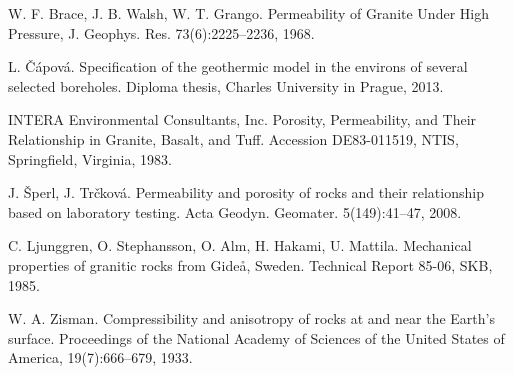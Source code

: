 \documentclass{article}
\begin{document}
\begin{thebibliography}{9}

 W. F. Brace,  J. B. Walsh, W. T. Grango.  Permeability of Granite Under High Pressure, J. Geophys. Res. 73(6):2225--2236, 1968.

 L. Čápová. Specification of the geothermic model in the environs of several selected boreholes. Diploma thesis, Charles University in Prague, 2013.

 INTERA Environmental Consultants, Inc. Porosity, Permeability,  and Their  Relationship  in  
Granite,  Basalt, and Tuff. Accession  DE83-011519, NTIS, Springfield, Virginia, 1983.

 J. Šperl, J. Trčková. Permeability and porosity of rocks and their relationship based on laboratory testing. Acta Geodyn. Geomater. 5(149):41--47, 2008.

 C. Ljunggren, O. Stephansson, O. Alm, H. Hakami, U. Mattila. Mechanical properties of granitic rocks from Gide\aa, Sweden. Technical Report 85-06, SKB, 1985.

 W. A. Zisman. Compressibility and anisotropy of rocks at and near the Earth's surface. Proceedings of the National Academy of Sciences of the United States of America, 19(7):666--679, 1933.

\end{thebibliography}
\end{document}
